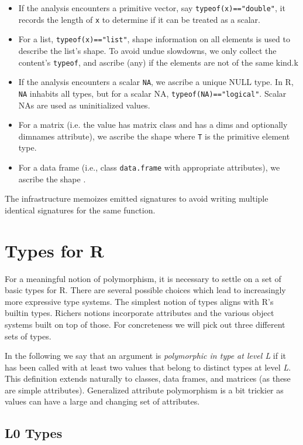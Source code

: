 \documentclass[acmsmall,10pt,review,anonymous]{acmart}\settopmatter{printfolios=true,printccs=false,printacmref=false}
\newcommand{\code}[1]{\lstinline|#1|\xspace}
\begin{document}
\begin{itemize}
\item If the analysis encounters a primitive vector, say
  \code{typeof(x)=="double"}, it records the length of {\tt x} to determine
  if it can be treated as a scalar.
\item For a list, \code{typeof(x)=="list"}, shape information on all
  elements is used to describe the list's shape.  To avoid undue slowdowns,
  we only collect the content's \code{typeof}, and ascribe \ANY (any) if the
  elements are not of the same kind.k
\item If the analysis encounters a scalar \code{NA}, we ascribe a unique
  NULL type.  In R, \code{NA} inhabits all types, but for a scalar NA,
  \code{typeof(NA)=="logical"}. Scalar NAs are used as uninitialized values.
\item For a matrix (i.e. the value has matrix class and has a dims and
  optionally dimnames attribute), we ascribe the shape 
  where {\tt T} is the primitive element type.
\item For a data frame (i.e., class {\tt data.frame} with appropriate
  attributes), we ascribe the shape .
\end{itemize}

The infrastructure memoizes emitted signatures to avoid writing multiple
identical signatures for the same function.

\section{Types for R}

For a meaningful notion of polymorphism, it is necessary to settle on a set
of basic types for R. There are several possible choices which lead to
increasingly more expressive type systems. The simplest notion of types
aligns with R's builtin types. Richers notions incorporate attributes and
the various object systems built on top of those. For concreteness we will
pick out three different sets of types.

In the following we say that an argument is {\it polymorphic in type at
  level L} if it has been called with at least two values that belong to
distinct types at level \emph{L}. This definition extends naturally to
classes, data frames, and matrices (as these are simple attributes).
Generalized attribute polymorphism is a bit trickier as values can have a
large and changing set of attributes.

\subsection{L0 Types}
\label{sec:L0def}
\end{document}
